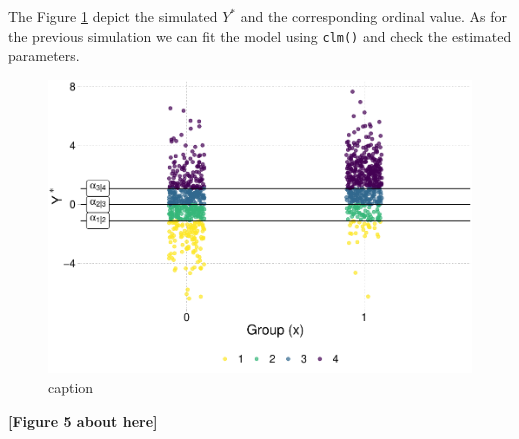 \documentclass[
  man,floatsintext]{apa6}
\begin{document}
\normalsize

The Figure \ref{fig:fig-sim-from-latent} depict the simulated \(Y^{*}\) and the corresponding ordinal value. As for the previous simulation we can fit the model using \texttt{clm()} and check the estimated parameters.

\scriptsize

\begin{figure}

{\centering \includegraphics{paper-new_files/figure-latex/fig-sim-from-latent-1} 

}

\caption{caption}\label{fig:fig-sim-from-latent}
\end{figure}

\begin{center}\textbf{[Figure 5 about here]} \end{center}

\normalsize

\scriptsize
\end{document}
